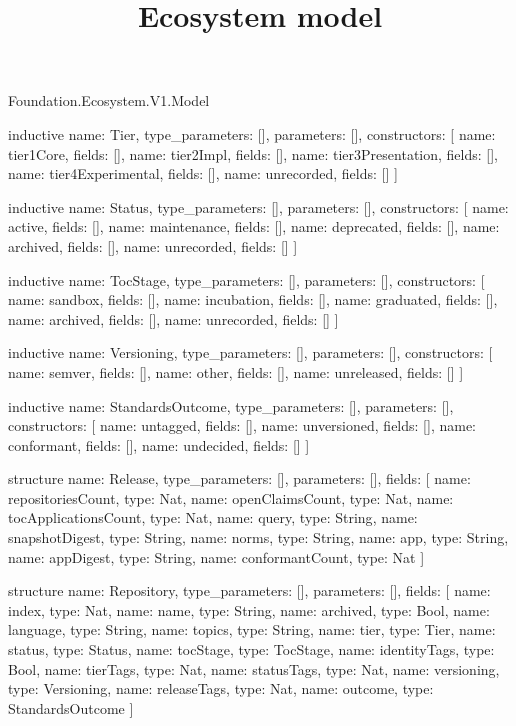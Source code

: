 \begin{lexlean}{Foundation.Ecosystem.V1.Model}
\title{Ecosystem model}
\begin{semanticmodule}
inductive{
  name: Tier,
  type_parameters: [],
  parameters: [],
  constructors: [
    {name: tier1Core, fields: []},
    {name: tier2Impl, fields: []},
    {name: tier3Presentation, fields: []},
    {name: tier4Experimental, fields: []},
    {name: unrecorded, fields: []}
  ]
}

inductive{
  name: Status,
  type_parameters: [],
  parameters: [],
  constructors: [
    {name: active, fields: []},
    {name: maintenance, fields: []},
    {name: deprecated, fields: []},
    {name: archived, fields: []},
    {name: unrecorded, fields: []}
  ]
}

inductive{
  name: TocStage,
  type_parameters: [],
  parameters: [],
  constructors: [
    {name: sandbox, fields: []},
    {name: incubation, fields: []},
    {name: graduated, fields: []},
    {name: archived, fields: []},
    {name: unrecorded, fields: []}
  ]
}

inductive{
  name: Versioning,
  type_parameters: [],
  parameters: [],
  constructors: [
    {name: semver, fields: []},
    {name: other, fields: []},
    {name: unreleased, fields: []}
  ]
}

inductive{
  name: StandardsOutcome,
  type_parameters: [],
  parameters: [],
  constructors: [
    {name: untagged, fields: []},
    {name: unversioned, fields: []},
    {name: conformant, fields: []},
    {name: undecided, fields: []}
  ]
}

structure{
  name: Release,
  type_parameters: [],
  parameters: [],
  fields: [
    {name: repositoriesCount, type: Nat},
    {name: openClaimsCount, type: Nat},
    {name: tocApplicationsCount, type: Nat},
    {name: query, type: String},
    {name: snapshotDigest, type: String},
    {name: norms, type: String},
    {name: app, type: String},
    {name: appDigest, type: String},
    {name: conformantCount, type: Nat}
  ]
}

structure{
  name: Repository,
  type_parameters: [],
  parameters: [],
  fields: [
    {name: index, type: Nat},
    {name: name, type: String},
    {name: archived, type: Bool},
    {name: language, type: String},
    {name: topics, type: String},
    {name: tier, type: Tier},
    {name: status, type: Status},
    {name: tocStage, type: TocStage},
    {name: identityTags, type: Bool},
    {name: tierTags, type: Nat},
    {name: statusTags, type: Nat},
    {name: versioning, type: Versioning},
    {name: releaseTags, type: Nat},
    {name: outcome, type: StandardsOutcome}
  ]
}


\end{semanticmodule}
\end{lexlean}
